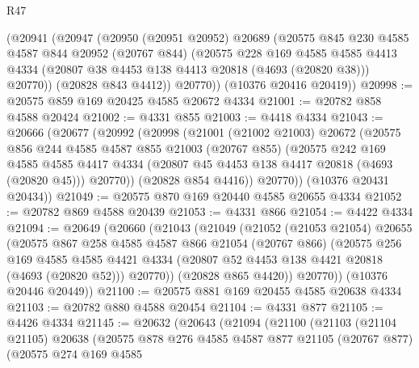 \begin{lexlean}{R47}
\begin{coremodule}
      (@20941
        (@20947
          (@20950
            (@20951 @20952)
            @20689
            (@20575
              @845
              @230
              @4585
              @4587
              @844
              @20952
              (@20767 @844)
              (@20575
                @228
                @169
                @4585
                @4585
                @4413
                @4334
                (@20807 @38 @4453 @138 @4413 @20818 (@4693 (@20820 @38)))
                @20770))
            (@20828 @843 @4412))
          @20770))
      (@10376 @20416 @20419))
@20998 := @20575 @859 @169 @20425 @4585 @20672 @4334
@21001 := @20782 @858 @4588 @20424
@21002 := @4331 @855
@21003 := @4418 @4334
@21043 := @20666
    (@20677
      (@20992
        (@20998
          (@21001
            (@21002 @21003)
            @20672
            (@20575
              @856
              @244
              @4585
              @4587
              @855
              @21003
              (@20767 @855)
              (@20575
                @242
                @169
                @4585
                @4585
                @4417
                @4334
                (@20807 @45 @4453 @138 @4417 @20818 (@4693 (@20820 @45)))
                @20770))
            (@20828 @854 @4416))
          @20770))
      (@10376 @20431 @20434))
@21049 := @20575 @870 @169 @20440 @4585 @20655 @4334
@21052 := @20782 @869 @4588 @20439
@21053 := @4331 @866
@21054 := @4422 @4334
@21094 := @20649
    (@20660
      (@21043
        (@21049
          (@21052
            (@21053 @21054)
            @20655
            (@20575
              @867
              @258
              @4585
              @4587
              @866
              @21054
              (@20767 @866)
              (@20575
                @256
                @169
                @4585
                @4585
                @4421
                @4334
                (@20807 @52 @4453 @138 @4421 @20818 (@4693 (@20820 @52)))
                @20770))
            (@20828 @865 @4420))
          @20770))
      (@10376 @20446 @20449))
@21100 := @20575 @881 @169 @20455 @4585 @20638 @4334
@21103 := @20782 @880 @4588 @20454
@21104 := @4331 @877
@21105 := @4426 @4334
@21145 := @20632
    (@20643
      (@21094
        (@21100
          (@21103
            (@21104 @21105)
            @20638
            (@20575
              @878
              @276
              @4585
              @4587
              @877
              @21105
              (@20767 @877)
              (@20575
                @274
                @169
                @4585

\end{coremodule}
\end{lexlean}
